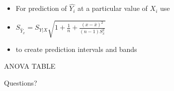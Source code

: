\documentclass[handout,x11names,unknownkeysallowed]{beamer}
\makeatletter
\newcommand{\beamitem}{\begin{itemize}[<+-|alert@+>]}
\makeatother
\begin{document}
\begin{frame}

\beamitem
\item For prediction of $\hat{Y_i}$ at a particular value of $X_i$ use
\item $S_{\hat{Y}_{x}} =S_{Y|X} \sqrt{1+\frac{1}{n}+ \frac{(x-\bar{x})^2}{(n-1)S^2_x}}$
\item to create prediction intervals and bands
\end{itemize}
\end{frame}


\begin{frame}
\begin{center}
{\Huge
ANOVA TABLE}
\end{center}
\end{frame}

\begin{frame}
\begin{center}
Questions?
\end{center}

\end{frame}
\end{document}
